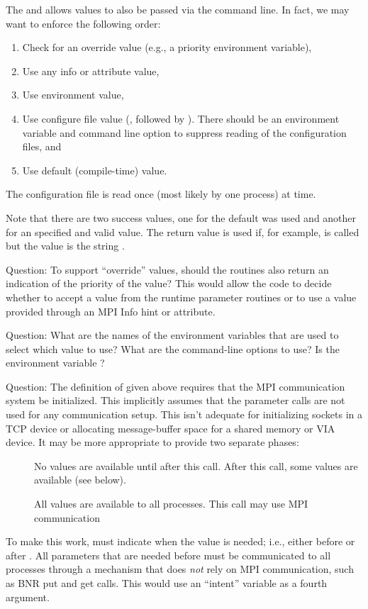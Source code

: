 \documentclass{article}
\begin{document}
The  and  allows
values to also be passed via the command line.  
In fact, we may want to enforce the following order:
\begin{enumerate}
\item Check for an override value (e.g., a priority environment variable),
\item Use any info or attribute value,
\item Use environment value,
\item Use configure file value (, followed by
  ).  There should be an environment variable and command
  line option to suppress reading of the configuration files, and
\item Use default (compile-time) value.
\end{enumerate}
The configuration file is read once (most likely by one process) at
 time.  

Note that there are two success values, one for the default was used
and another for an specified and valid value.  The return value
 is used 
if, for example,  is called but the value
is the string .

Question: To support ``override'' values, should the routines also
return an indication of the priority of the value?  This would allow
the code to decide whether to accept a value from the runtime
parameter routines or to use a value provided through an MPI Info hint
or attribute.

Question: What are the names of the environment variables that are
used to select which value to use?  What are the command-line options
to use?  Is the environment variable ?

Question: The definition of  given above
requires that the MPI communication system be initialized.  This
implicitly assumes that the parameter calls are not used for any
communication setup.  This isn't adequate for initializing sockets in
a TCP device or allocating message-buffer space for a shared memory or
VIA device.  It may be more appropriate to provide two separate
phases:
\begin{description}
\item[]No values are available until after this call.  
After this call, some values are available (see below).
\item[]All values are available to all processes.  This 
call may use MPI communication
\end{description}
To make this work,  must indicate when the
value is needed; i.e., either before or after
.  All parameters that are needed before
 must be communicated to all processes through
a mechanism that does \emph{not} rely on MPI communication, such as
BNR put and get calls.  This would use an ``intent'' variable as a
fourth argument.
\end{document}
